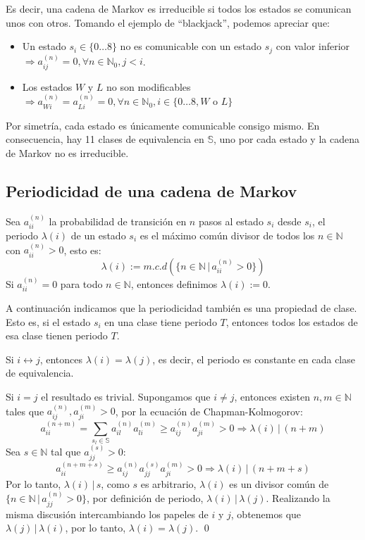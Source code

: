 Es decir, una cadena de Markov es irreducible si todos los estados se comunican unos con otros. Tomando el ejemplo de \enquote{blackjack}, podemos apreciar que:
    \begin{itemize}
        \item Un estado $s_i\in \{0\dots 8\}$ no es comunicable con un estado $s_j$ con valor inferior $\Longrightarrow a_{ij}^{(n)}=0, \forall n\in\mathbb{N}_0, j<i$.
        \item Los estados $W$ y $L$ no son modificables $\Longrightarrow a_{Wi}^{(n)}=a_{Li}^{(n)}=0, \forall n\in\mathbb{N}_0,  i \in \{0\dots 8, W$ o $L\}$
    \end{itemize}

Por simetría, cada estado es únicamente comunicable consigo mismo. En consecuencia, hay 11 clases de equivalencia en $\mathbb{S}$, uno por cada estado y la cadena de Markov no es irreducible.

\subsection{Periodicidad de una cadena de Markov}
\begin{definition}
Sea $a_{ii}^{(n)}$ la probabilidad de transición en $n$ pasos al estado $s_i$ desde $s_i$, el periodo $\lambda(i)$ de un estado $s_i$ es el máximo común divisor de todos los $n\in\mathbb{N}$ con $a_{ii}^{(n)}>0$, esto es:
\[
\lambda(i):=m.c.d(\{n\in\mathbb{N}\,|\, a_{ii}^{(n)}>0\})
\]
Si $a_{ii}^{(n)}=0$ para todo $n\in\mathbb{N}$, entonces definimos $\lambda(i):=0$.
\end{definition}
A continuación indicamos que la periodicidad también es una propiedad de clase. Esto es, si el estado $s_i$ en una clase tiene periodo $T$, entonces todos los estados de esa clase tienen periodo $T$.
\begin{theorem}
    Si $i\longleftrightarrow j$, entonces $\lambda(i)=\lambda(j)$, es decir, el periodo es constante en cada clase de equivalencia.
\end{theorem}
\begin{proofs*}
Si $i=j$ el resultado es trivial. Supongamos que $i\neq j$, entonces existen $n,m\in\mathbb{N}$ tales que $a_{ij}^{(n)},a_{ji}^{(m)}>0$, por la ecuación de Chapman-Kolmogorov:
\[ a_{ii}^{(n+m)}=\sum\limits_{s_l\in\mathbb{S}}a_{il}^{(n)}a_{li}^{(m)}\geq a_{ij}^{(n)}a_{ji}^{(m)}>0\Longrightarrow\lambda(i)\,|\,(n+m)\]
Sea $s\in\mathbb{N}$ tal que $a_{jj}^{(s)}>0$:
\[ a_{ii}^{(n+m+s)}\geq a_{ij}^{(n)}a_{jj}^{(s)}a_{ji}^{(m)}>0\Longrightarrow \lambda(i)\,|\,(n+m+s)\]
Por lo tanto, $\lambda(i)\,|\,s$, como $s$ es arbitrario, $\lambda(i)$ es un divisor común de $\{n\in\mathbb{N}\,|\, a_{jj}^{(n)}>0\}$, por definición de periodo, $\lambda(i)\,|\,\lambda(j)$. Realizando la misma discusión intercambiando los papeles de $i$ y $j$, obtenemos que $\lambda(j)\,|\,\lambda(i)$, por lo tanto, $\lambda(i)=\lambda(j)$. \qed
\end{proofs*}

